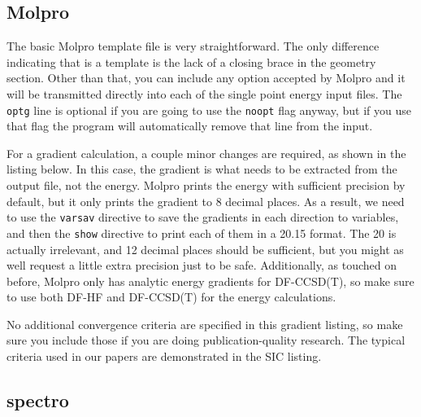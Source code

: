 \documentclass{article}
\begin{document}
\subsection{Molpro}

The basic Molpro template file is very straightforward. The only
difference indicating that is a template is the lack of a closing
brace in the geometry section. Other than that, you can include any
option accepted by Molpro and it will be transmitted directly into
each of the single point energy input files. The \verb|optg| line is
optional if you are going to use the \verb|noopt| flag anyway, but if
you use that flag the program will automatically remove that line from
the input.



For a gradient calculation, a couple minor changes are required, as
shown in the listing below. In this case, the gradient is what needs
to be extracted from the output file, not the energy. Molpro prints
the energy with sufficient precision by default, but it only prints
the gradient to 8 decimal places. As a result, we need to use the
\verb|varsav| directive to save the gradients in each direction to
variables, and then the \verb|show| directive to print each of them in
a 20.15 format. The 20 is actually irrelevant, and 12 decimal places
should be sufficient, but you might as well request a little extra
precision just to be safe. Additionally, as touched on before, Molpro
only has analytic energy gradients for DF-CCSD(T), so make sure to use
both DF-HF and DF-CCSD(T) for the energy calculations.



No additional convergence criteria are specified in this gradient
listing, so make sure you include those if you are doing
publication-quality research. The typical criteria used in our papers
are demonstrated in the SIC listing.

\subsection{spectro}
\end{document}

